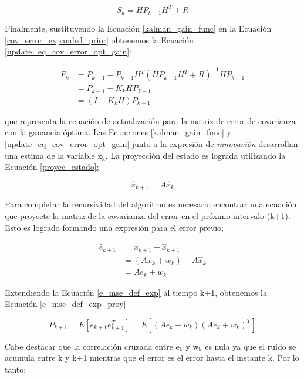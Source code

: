 \documentclass[10pt,a4paper]{article}
\begin{document}
\begin{equation}
    S_k = HP_{k-1}H^T + R \label{cov_pred_medicion}
\end{equation}

Finalmente, sustituyendo la Ecuaci\'on \ref{kalman_gain_func} en la Ecuaci\'on 
\ref{cov_error_expanded_prior} obtenemos la Ecuaci\'on
\ref{update_eq_cov_error_opt_gain}:

\begin{align}
    P_k &= P_{k-1} - P_{k-1}H^T\left(HP_{k-1}H^T + R\right)^{-1}HP_{k-1}\nonumber\\
        &= P_{k-1} - K_kHP_{k-1} \nonumber \\
        &= (I - K_kH)P_{k-1} \label{update_eq_cov_error_opt_gain}
\end{align}

que representa la ecuaci\'on de actualizaci\'on para la matriz de error de
covarianza con la ganancia \'optima. Las Ecuaciones \ref{kalman_gain_func} y
\ref{update_eq_cov_error_opt_gain} junto a la expresi\'on de \emph{innovaci\'on}
desarrollan una estima de la variable $\mathrm{x_k}$. La proyecci\'on del estado
es lograda utilizando la Ecuaci\'on \ref{proyec_estado};

\begin{equation}
    \hat{x}_{k+1} = A\hat{x}_k\label{proyec_estado}
\end{equation}

Para completar la recursividad del algoritmo es necesario encontrar una
ecuaci\'on que proyecte la matriz de la covarianza del error en el pr\'oximo
intervalo (k+1). Esto es logrado formando una expresi\'on para el error previo;

\begin{align}
    \hat{e}_{k+1} &= x_{k+1} - \hat{x}_{k+1} \nonumber \\
                  &= \left(Ax_k + w_k\right) - A\hat{x}_k \nonumber \\
                  &= Ae_k + w_k \label{prior_err_exp}
\end{align}

Extendiendo la Ecuaci\'on \ref{e_mse_def_exp} al tiempo k+1, obtenemos la
Ecuaci\'on \ref{e_mse_def_exp_proy}

\begin{equation}
    P_{k+1} = E\left[e_{k+1}e_{k+1}^T\right] = E\left[\left(Ae_k +
    w_k\right)\left(Ae_k + w_k\right)^T\right]\label{e_mse_def_exp_proy}
\end{equation}

Cabe destacar que la correlaci\'on cruzada entre $\mathrm{e_k}$ y $\mathrm{w_k}$ 
es nula ya que el ruido se acumula entre k y k+1 mientras que el error es el
error hasta el instante k. Por lo tanto;
\end{document}
